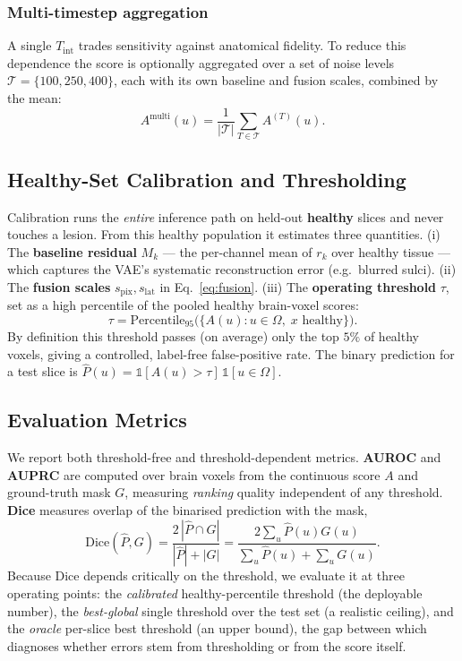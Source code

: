 \documentclass[12pt, a4paper]{article}
\begin{document}
\subsubsection{Multi-timestep aggregation}
A single $T_{\text{int}}$ trades sensitivity against anatomical fidelity. To reduce this dependence the score is optionally aggregated over a set of noise levels $\mathcal{T} = \{100, 250, 400\}$, each with its own baseline and fusion scales, combined by the mean:
\begin{equation}
    A^{\text{multi}}(u) = \frac{1}{|\mathcal{T}|}\sum_{T\in\mathcal{T}} A^{(T)}(u).
\end{equation}

\subsection{Healthy-Set Calibration and Thresholding}
\label{sec:calib}
Calibration runs the \emph{entire} inference path on held-out \textbf{healthy} slices and never touches a lesion. From this healthy population it estimates three quantities. (i) The \textbf{baseline residual} $M_k$ — the per-channel mean of $r_k$ over healthy tissue — which captures the VAE's systematic reconstruction error (e.g.\ blurred sulci). (ii) The \textbf{fusion scales} $s_{\text{pix}}, s_{\text{lat}}$ in Eq.~\eqref{eq:fusion}. (iii) The \textbf{operating threshold} $\tau$, set as a high percentile of the pooled healthy brain-voxel scores:
\begin{equation}
    \tau = \mathrm{Percentile}_{95}\big(\{A(u) : u\in\Omega,\; x \text{ healthy}\}\big).
\end{equation}
By definition this threshold passes (on average) only the top $5\%$ of healthy voxels, giving a controlled, label-free false-positive rate. The binary prediction for a test slice is $\hat{P}(u) = \mathbb{1}[A(u) > \tau]\,\mathbb{1}[u\in\Omega]$.

\subsection{Evaluation Metrics}
We report both threshold-free and threshold-dependent metrics. \textbf{AUROC} and \textbf{AUPRC} are computed over brain voxels from the continuous score $A$ and ground-truth mask $G$, measuring \emph{ranking} quality independent of any threshold. \textbf{Dice} measures overlap of the binarised prediction with the mask,
\begin{equation}
    \mathrm{Dice}(\hat{P}, G) = \frac{2\,|\hat{P}\cap G|}{|\hat{P}| + |G|}
    = \frac{2\sum_u \hat{P}(u)G(u)}{\sum_u \hat{P}(u) + \sum_u G(u)}.
\end{equation}
Because Dice depends critically on the threshold, we evaluate it at three operating points: the \emph{calibrated} healthy-percentile threshold (the deployable number), the \emph{best-global} single threshold over the test set (a realistic ceiling), and the \emph{oracle} per-slice best threshold (an upper bound), the gap between which diagnoses whether errors stem from thresholding or from the score itself.
\end{document}
